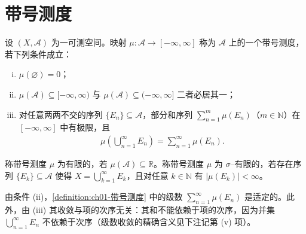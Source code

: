 \documentclass[../../main.tex]{subfiles}%
\begin{document}
\section{带号测度}\label{section:ch01-带号测度}

\begin{definition}\label{definition:ch01-带号测度}
设 $(X,\mathcal{A})$ 为一可测空间。映射 $\mu:\mathcal{A}\to[-\infty,\infty]$ 称为 $\mathcal{A}$ 上的一个带号测度，若下列条件成立：
\begin{enumerate}[(i)]
\item $\mu(\varnothing)=0$；
\item $\mu(\mathcal{A})\subseteq[-\infty,\infty)$ 与 $\mu(\mathcal{A})\subseteq(-\infty,\infty]$ 二者必居其一；
\item 对任意两两不交的序列 $\{E_n\}\subseteq\mathcal{A}$，部分和序列 $\sum_{n=1}^m\mu(E_n)$（$m\in\mathbb{N}$）在 $[-\infty,\infty]$ 中有极限，且
\begin{align*}
\mu\left(\bigcup_{n=1}^\infty E_n\right)=\sum_{n=1}^\infty\mu(E_n).
\end{align*}
\end{enumerate}
称带号测度 $\mu$ 为有限的，若 $\mu(\mathcal{A})\subseteq\mathbb{R}$。称带号测度 $\mu$ 为 $\sigma$--有限的，若存在序列 $\{E_k\}\subseteq\mathcal{A}$ 使得 $X=\bigcup_{k=1}^\infty E_k$，且对任意 $k\in\mathbb{N}$ 有 $|\mu(E_k)|<\infty$。
\end{definition}

由条件 (ii)，\cref{definition:ch01-带号测度} 中的级数 $\sum_{n=1}^\infty\mu(E_n)$ 是适定的。此外，由 (iii) 其收敛与项的次序无关：其和不能依赖于项的次序，因为并集 $\bigcup_{n=1}^\infty E_n$ 不依赖于次序（级数收敛的精确含义见下注记第 (v) 项）。
\end{document}
